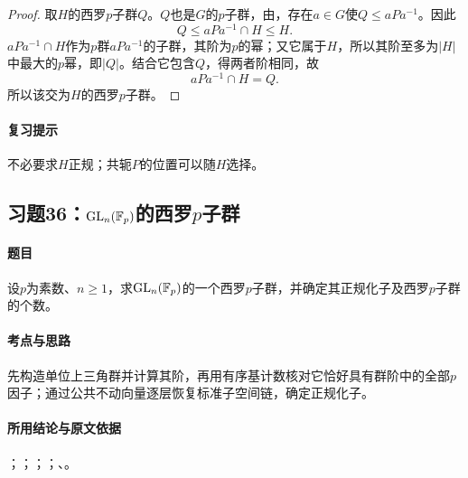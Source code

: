 
\begin{proof}
取$H$的西罗$p$子群$Q$。$Q$也是$G$的$p$子群，由，存在$a\in G$使$Q\leq aPa^{-1}$。因此
\[
Q\leq aPa^{-1}\cap H\leq H.
\]
$aPa^{-1}\cap H$作为$p$群$aPa^{-1}$的子群，其阶为$p$的幂；又它属于$H$，所以其阶至多为$|H|$中最大的$p$幂，即$|Q|$。结合它包含$Q$，得两者阶相同，故
\[
aPa^{-1}\cap H=Q.
\]
所以该交为$H$的西罗$p$子群。
\end{proof}

\paragraph{复习提示}
不必要求$H$正规；共轭$P$的位置可以随$H$选择。


\subsection{习题36：\texorpdfstring{$\operatorname{GL}_n(\mathbb F_p)$的西罗$p$子群}{GLn(Fp)的西罗p子群}}
\label{ex:2:36}

\paragraph{题目}
设$p$为素数、$n\ge1$，求$\operatorname{GL}_n(\mathbb F_p)$的一个西罗$p$子群，并确定其正规化子及西罗$p$子群的个数。

\paragraph{考点与思路}
先构造单位上三角群并计算其阶，再用有序基计数核对它恰好具有群阶中的全部$p$因子；通过公共不动向量逐层恢复标准子空间链，确定正规化子。

\paragraph{所用结论与原文依据}
；；；；、。


